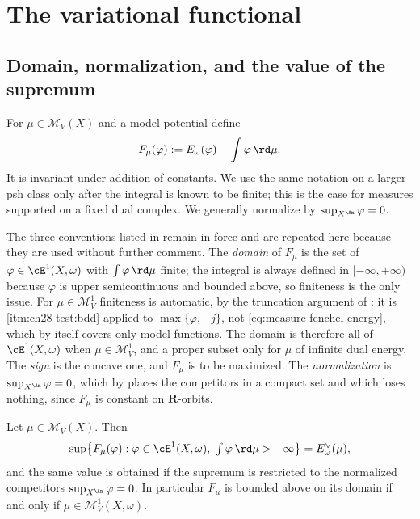 \section{The variational functional}
\label{sec:ch28-variational}

\subsection{Domain, normalization, and the value of the supremum}
\label{sec:ch28-domain}

For $\mu\in\mathcal M_V(X)$ and a model potential define
\begin{equation}
\label{eq:variational-functional}
                  F_\mu(\varphi)
                  :=E_\omega(\varphi)-\int\varphi\,\rd \mu.
\end{equation}
It is invariant under addition of constants.  We use the same notation on a
larger psh class only after the integral is known to be finite; this is the
case for measures supported on a fixed dual complex.  We generally
normalize by $\sup_{X^{\An}}\varphi=0$.

The three conventions listed in 
remain in force and are repeated here because they are used without further
comment.  The \emph{domain} of $F_\mu$ is the set of
$\varphi\in\cE^1(X,\omega)$ with $\int\varphi\,\rd\mu$ finite; the
integral is always defined in $[-\infty,+\infty)$ because $\varphi$ is
upper semicontinuous and bounded above, so finiteness is the only issue.
For $\mu\in\mathcal M^1_V$ finiteness is automatic, by the truncation
argument of : it is
\,\cref{itm:ch28-test:bdd} applied to
$\max\{\varphi,-j\}$, not \eqref{eq:measure-fenchel-energy}, which by
itself covers only model functions.  The domain is therefore all of
$\cE^1(X,\omega)$ when $\mu\in\mathcal M^1_V$, and a proper subset only
for $\mu$ of infinite dual energy.  The
\emph{sign} is the concave one, and $F_\mu$ is to be maximized.  The
\emph{normalization} is $\sup_{X^{\An}}\varphi=0$, which by
 places the competitors in a compact set and
which loses nothing, since $F_\mu$ is constant on
$\mathbf R$-orbits.

\begin{proposition}
\label{prop:ch28-sup-is-dual-energy}
Let $\mu\in\mathcal M_V(X)$.  Then
\begin{equation}
\label{eq:ch28-sup-is-dual-energy}
 \sup\bigl\{F_\mu(\varphi):\varphi\in\cE^1(X,\omega),\
   \textstyle\int\varphi\,\rd\mu>-\infty\bigr\}
 =E^\vee_\omega(\mu),
\end{equation}
and the same value is obtained if the supremum is restricted to the
normalized competitors $\sup_{X^{\An}}\varphi=0$.  In particular $F_\mu$
is bounded above on its domain if and only if
$\mu\in\mathcal M^1_V(X,\omega)$.
\end{proposition}

